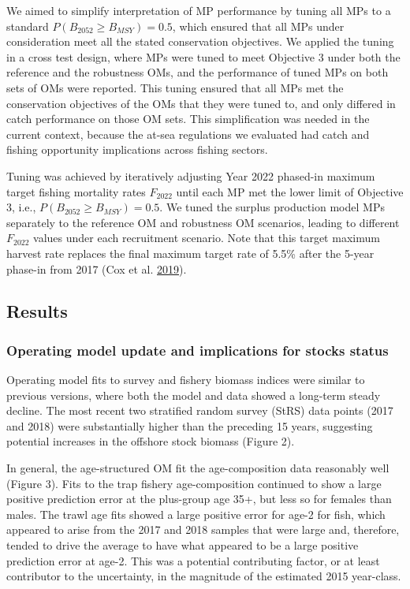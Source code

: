 \documentclass[11pt]{book}
\begin{document}
We aimed to simplify interpretation of MP performance by tuning all MPs to a standard \(P(B_{2052} \geq B_{MSY}) = 0.5\), which ensured that all MPs under consideration meet all the stated conservation objectives. We applied the tuning in a cross test design, where MPs were tuned to meet Objective 3 under both the reference and the robustness OMs, and the performance of tuned MPs on both sets of OMs were reported. This tuning ensured that all MPs met the conservation objectives of the OMs that they were tuned to, and only differed in catch performance on those OM sets. This simplification was needed in the current context, because the at-sea regulations we evaluated had catch and fishing opportunity implications across fishing sectors.

Tuning was achieved by iteratively adjusting Year 2022 phased-in maximum target fishing mortality rates \(F_{2022}\) until each MP met the lower limit of Objective 3, i.e., \(P(B_{2052} \geq B_{MSY}) = 0.5\). We tuned the surplus production model MPs separately to the reference OM and robustness OM scenarios, leading to different \(F_{2022}\) values under each recruitment scenario. Note that this target maximum harvest rate replaces the final maximum target rate of 5.5\% after the 5-year phase-in from 2017 (Cox et al. \protect\hyperlink{ref-cox2019evaluating}{2019}).

\hypertarget{results}{%
\subsection{Results}\label{results}}

\hypertarget{operating-model-update-and-implications-for-stocks-status}{%
\subsubsection{Operating model update and implications for stocks status}\label{operating-model-update-and-implications-for-stocks-status}}

Operating model fits to survey and fishery biomass indices were similar to previous versions, where both the model and data showed a long-term steady decline. The most recent two stratified random survey (StRS) data points (2017 and 2018) were substantially higher than the preceding 15 years, suggesting potential increases in the offshore stock biomass (Figure 2).

In general, the age-structured OM fit the age-composition data reasonably well (Figure 3). Fits to the trap fishery age-composition continued to show a large positive prediction error at the plus-group age 35+, but less so for females than males. The trawl age fits showed a large positive error for age-2 for fish, which appeared to arise from the 2017 and 2018 samples that were large and, therefore, tended to drive the average to have what appeared to be a large positive prediction error at age-2. This was a potential contributing factor, or at least contributor to the uncertainty, in the magnitude of the estimated 2015 year-class.
\end{document}
